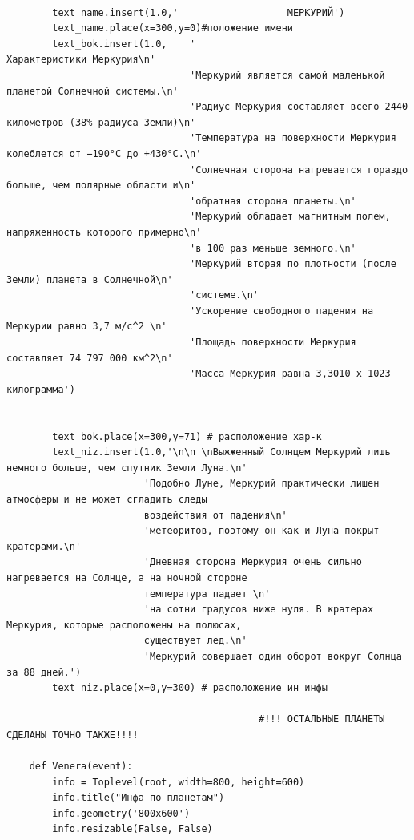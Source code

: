 \documentclass[11pt,a4paper]{report}
\begin{document}
\begin{verbatim}
       
        text_name.insert(1.0,'                   МЕРКУРИЙ')
        text_name.place(x=300,y=0)#положение имени
        text_bok.insert(1.0,    '                                           Характеристики Меркурия\n' 
                                'Меркурий является самой маленькой планетой Солнечной системы.\n'
                                'Радиус Меркурия составляет всего 2440 километров (38% радиуса Земли)\n'
                                'Температура на поверхности Меркурия колеблется от −190°C до +430°C.\n'
                                'Солнечная сторона нагревается гораздо больше, чем полярные области и\n'
                                'обратная сторона планеты.\n'
                                'Меркурий обладает магнитным полем, напряженность которого примерно\n' 
                                'в 100 раз меньше земного.\n'
                                'Меркурий вторая по плотности (после Земли) планета в Солнечной\n'
                                'системе.\n'
                                'Ускорение свободного падения на Меркурии равно 3,7 м/c^2 \n'
                                'Площадь поверхности Меркурия составляет 74 797 000 км^2\n' 
                                'Масса Меркурия равна 3,3010 х 1023 килограмма')
        
        
        text_bok.place(x=300,y=71) # расположение хар-к        
        text_niz.insert(1.0,'\n\n \nВыжженный Солнцем Меркурий лишь немного больше, чем спутник Земли Луна.\n'
                        'Подобно Луне, Меркурий практически лишен атмосферы и не может сгладить следы 
                        воздействия от падения\n' 
                        'метеоритов, поэтому он как и Луна покрыт кратерами.\n'
                        'Дневная сторона Меркурия очень сильно нагревается на Солнце, а на ночной стороне 
                        температура падает \n'
                        'на сотни градусов ниже нуля. В кратерах Меркурия, которые расположены на полюсах, 
                        существует лед.\n'
                        'Меркурий совершает один оборот вокруг Солнца за 88 дней.')
        text_niz.place(x=0,y=300) # расположение ин инфы  
                                              
                                            #!!! ОСТАЛЬНЫЕ ПЛАНЕТЫ СДЕЛАНЫ ТОЧНО ТАКЖЕ!!!!
        
    def Venera(event):  
        info = Toplevel(root, width=800, height=600)
        info.title("Инфа по планетам")
        info.geometry('800x600')
        info.resizable(False, False)  
        

\end{verbatim}
\end{document}
